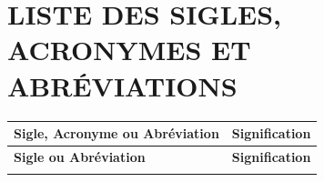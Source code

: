 \newpage
\section*{\centering \small LISTE DES SIGLES, ACRONYMES ET ABRÉVIATIONS}

\begin{longtable}{|>{\centering\arraybackslash}p{4cm}|p{10cm}|}
	\hline
	\rowcolor{customBlue!30}
	\textbf{Sigle, Acronyme ou Abréviation} & \textbf{Signification} \\
	\hline
	\endfirsthead
	
	\hline
	\rowcolor{customBlue!30}
	\textbf{Sigle ou Abréviation} & \textbf{Signification} \\
	\hline
	\endhead
	
	\endfoot
	
	\hline
	\endlastfoot
	

\end{longtable}
